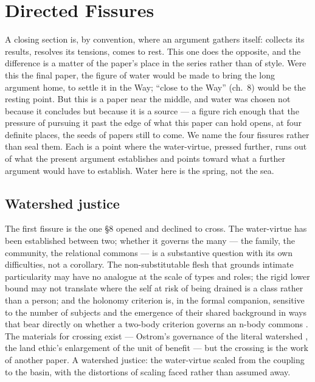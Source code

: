 \section{Directed Fissures}
\label{p20:sec:fissures}

\noindent
A closing section is, by convention, where an argument gathers itself: collects its results, resolves its tensions, comes to rest. This one does the opposite, and the difference is a matter of the paper's place in the series rather than of style. Were this the final paper, the figure of water would be made to bring the long argument home, to settle it in the Way; ``close to the Way'' (ch.~8) would be the resting point. But this is a paper near the middle, and water was chosen not because it concludes but because it is a source --- a figure rich enough that the pressure of pursuing it past the edge of what this paper can hold opens, at four definite places, the seeds of papers still to come. We name the four fissures rather than seal them. Each is a point where the water-virtue, pressed further, runs out of what the present argument establishes and points toward what a further argument would have to establish. Water here is the spring, not the sea.

\subsection{Watershed justice}
\label{p20:sub:fissure-basin}

The first fissure is the one §8 opened and declined to cross. The water-virtue has been established between two; whether it governs the many --- the family, the community, the relational commons --- is a substantive question with its own difficulties, not a corollary. The non-substitutable flesh that grounds intimate particularity may have no analogue at the scale of types and roles; the rigid lower bound may not translate where the self at risk of being drained is a class rather than a person; and the holonomy criterion is, in the formal companion, sensitive to the number of subjects and the emergence of their shared background in ways that bear directly on whether a two-body criterion governs an n-body commons \parencite{wan2026braid,paperxv}. The materials for crossing exist --- Ostrom's governance of the literal watershed \parencite{ostrom1990}, the land ethic's enlargement of the unit of benefit \parencite{leopold1949} --- but the crossing is the work of another paper. A watershed justice: the water-virtue scaled from the coupling to the basin, with the distortions of scaling faced rather than assumed away.

